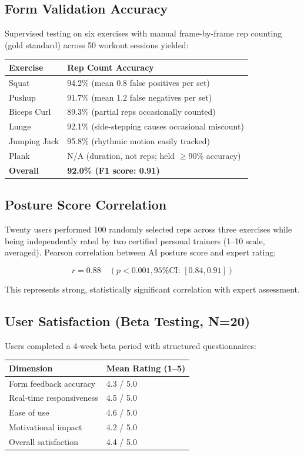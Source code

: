\documentclass[12pt,a4paper]{article}
\begin{document}
\subsection{Form Validation Accuracy}

Supervised testing on six exercises with manual frame-by-frame rep counting 
(gold standard) across 50 workout sessions yielded:

\begin{longtable}{p{6cm} p{7cm}}
\toprule
\textbf{Exercise} & \textbf{Rep Count Accuracy} \\
\midrule
\endhead
Squat & 94.2\% (mean 0.8 false positives per set) \\
Pushup & 91.7\% (mean 1.2 false negatives per set) \\
Biceps Curl & 89.3\% (partial reps occasionally counted) \\
Lunge & 92.1\% (side-stepping causes occasional miscount) \\
Jumping Jack & 95.8\% (rhythmic motion easily tracked) \\
Plank & N/A (duration, not reps; held $\geq$90\% accuracy) \\
\textbf{Overall} & \textbf{92.0\% (F1 score: 0.91)} \\
\bottomrule
\end{longtable}

\subsection{Posture Score Correlation}

Twenty users performed 100 randomly selected reps across three exercises while 
being independently rated by two certified personal trainers (1--10 scale, 
averaged). Pearson correlation between AI posture score and expert rating:

$$r = 0.88 \quad (p < 0.001, \text{95\% CI: } [0.84, 0.91])$$

This represents strong, statistically significant correlation with expert 
assessment.

\subsection{User Satisfaction (Beta Testing, N=20)}

Users completed a 4-week beta period with structured questionnaires:

\begin{longtable}{p{6cm} p{7cm}}
\toprule
\textbf{Dimension} & \textbf{Mean Rating (1--5)} \\
\midrule
\endhead
Form feedback accuracy & 4.3 / 5.0 \\
Real-time responsiveness & 4.5 / 5.0 \\
Ease of use & 4.6 / 5.0 \\
Motivational impact & 4.2 / 5.0 \\
Overall satisfaction & 4.4 / 5.0 \\
\bottomrule
\end{longtable}
\end{document}
